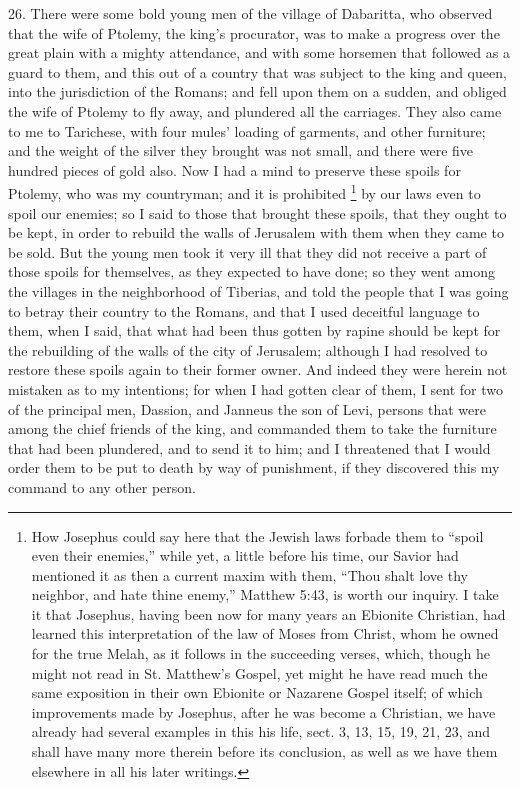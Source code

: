 26. There were some bold young men of the village of Dabaritta, who
observed that the wife of Ptolemy, the king's procurator, was to make a
progress over the great plain with a mighty attendance, and with some
horsemen that followed as a guard to them, and this out of a country that
was subject to the king and queen, into the jurisdiction of the Romans;
and fell upon them on a sudden, and obliged the wife of Ptolemy to fly
away, and plundered all the carriages. They also came to me to Tarichese,
with four mules' loading of garments, and other furniture; and the weight
of the silver they brought was not small, and there were five hundred
pieces of gold also. Now I had a mind to preserve these spoils for
Ptolemy, who was my countryman; and it is prohibited \footnote{How Josephus could say
here that the Jewish laws forbade them to ``spoil even their enemies,''
while yet, a little before his time, our Savior had mentioned it as then a
current maxim with them, ``Thou shalt love thy neighbor, and hate thine
enemy,'' Matthew 5:43, is worth our inquiry. I take it that Josephus,
having been now for many years an Ebionite Christian, had learned this
interpretation of the law of Moses from Christ, whom he owned for the true
Melah, as it follows in the succeeding verses, which, though he might not
read in St. Matthew's Gospel, yet might he have read much the same
exposition in their own Ebionite or Nazarene Gospel itself; of which
improvements made by Josephus, after he was become a Christian, we have
already had several examples in this his life, sect. 3, 13, 15, 19, 21,
23, and shall have many more therein before its conclusion, as well as we
have them elsewhere in all his later writings.} by our
laws even to spoil our enemies; so I said to those that brought these
spoils, that they ought to be kept, in order to rebuild the walls of
Jerusalem with them when they came to be sold. But the young men took it
very ill that they did not receive a part of those spoils for themselves,
as they expected to have done; so they went among the villages in the
neighborhood of Tiberias, and told the people that I was going to betray
their country to the Romans, and that I used deceitful language to them,
when I said, that what had been thus gotten by rapine should be kept for
the rebuilding of the walls of the city of Jerusalem; although I had
resolved to restore these spoils again to their former owner. And indeed
they were herein not mistaken as to my intentions; for when I had gotten
clear of them, I sent for two of the principal men, Dassion, and Janneus
the son of Levi, persons that were among the chief friends of the king,
and commanded them to take the furniture that had been plundered, and to
send it to him; and I threatened that I would order them to be put to
death by way of punishment, if they discovered this my command to any
other person.

